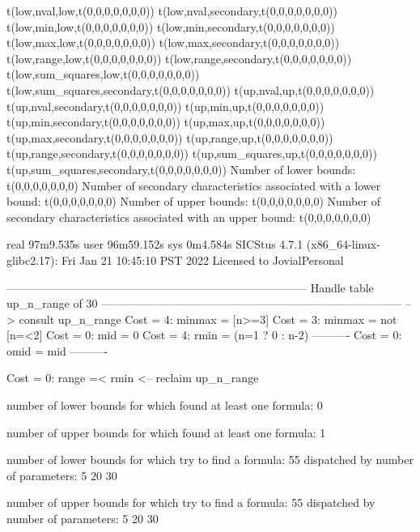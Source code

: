t(low,nval,low,t(0,0,0,0,0,0,0))
t(low,nval,secondary,t(0,0,0,0,0,0,0))
t(low,min,low,t(0,0,0,0,0,0,0))
t(low,min,secondary,t(0,0,0,0,0,0,0))
t(low,max,low,t(0,0,0,0,0,0,0))
t(low,max,secondary,t(0,0,0,0,0,0,0))
t(low,range,low,t(0,0,0,0,0,0,0))
t(low,range,secondary,t(0,0,0,0,0,0,0))
t(low,sum_squares,low,t(0,0,0,0,0,0,0))
t(low,sum_squares,secondary,t(0,0,0,0,0,0,0))
t(up,nval,up,t(0,0,0,0,0,0,0))
t(up,nval,secondary,t(0,0,0,0,0,0,0))
t(up,min,up,t(0,0,0,0,0,0,0))
t(up,min,secondary,t(0,0,0,0,0,0,0))
t(up,max,up,t(0,0,0,0,0,0,0))
t(up,max,secondary,t(0,0,0,0,0,0,0))
t(up,range,up,t(0,0,0,0,0,0,0))
t(up,range,secondary,t(0,0,0,0,0,0,0))
t(up,sum_squares,up,t(0,0,0,0,0,0,0))
t(up,sum_squares,secondary,t(0,0,0,0,0,0,0))
Number of lower bounds:                                             t(0,0,0,0,0,0,0)
Number of secondary characteristics associated with a lower bound:  t(0,0,0,0,0,0,0)
Number of upper bounds:                                             t(0,0,0,0,0,0,0)
Number of secondary characteristics associated with an upper bound: t(0,0,0,0,0,0,0)

real	97m9.535s
user	96m59.152s
sys	0m4.584s
SICStus 4.7.1 (x86_64-linux-glibc2.17): Fri Jan 21 10:45:10 PST 2022
Licensed to JovialPersonal


--------------------------------------------------------------------------------
Handle table up_n_range of 30
--------------------------------------------------------------------------------
--> consult up_n_range
Cost =  4:  minmax = [n>=3]
Cost =  3:  minmax = not [n=<2]
Cost =  0:  mid    = 0
Cost =  4:  rmin   = (n=1 ? 0 : n-2)
----------
Cost =  0:  omid   = mid
----------

Cost =  0:  range =< rmin
<-- reclaim up_n_range

number of lower bounds for which found at least one formula: 0

number of upper bounds for which found at least one formula: 1

number of lower bounds for which try to find a formula: 55
dispatched by number of parameters: 5  20  30

number of upper bounds for which try to find a formula: 55
dispatched by number of parameters: 5  20  30

